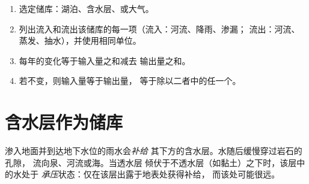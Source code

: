 \begin{method}[水量收支]\label{met:g10:freshwater-resources:budget}
\begin{enumerate}
  \item 选定储库：湖泊、含水层、或大气。
  \item 列出流入和流出该储库的每一项（流入：河流、降雨、渗漏；
        流出：河流、蒸发、抽水），并使用相同单位。
  \item 每年的变化等于输入量之和减去
        输出量之和。
  \item 若不变，则输入量等于输出量，
        等于除以二者中的任一个。
\end{enumerate}
\end{method}

\section{含水层作为储库}

渗入地面并到达地下水位的雨水会\emph{补给}
其下方的含水层。水随后缓慢穿过岩石的孔隙，
流向泉、河流或海。当透水层
倾伏于不透水层（如黏土）之下时，该层中的水处于
\emph{承压}状态：仅在该层出露于地表处获得补给，
而该处可能很远。

